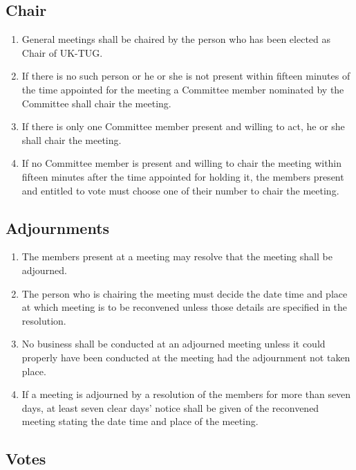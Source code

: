 \documentclass[a4paper,11pt]{article}
\begin{document}
\subsection{Chair}

\begin{enumerate}
\item General meetings shall be chaired by the person who has been elected as
  Chair of UK-TUG.
\item If there is no such person or he or she is not present within fifteen
  minutes of the time appointed for the meeting a Committee member nominated by
  the Committee shall chair the meeting.
\item If there is only one Committee member present and willing to act, he or
  she shall chair the meeting.
\item If no Committee member is present and willing to chair the meeting within
  fifteen minutes after the time appointed for holding it, the members present
  and entitled to vote must choose one of their number to chair the meeting.
\end{enumerate}

\subsection{Adjournments}

\begin{enumerate}
\item The members present at a meeting may resolve that the meeting shall be
  adjourned.
\item The person who is chairing the meeting must decide the date time and place
  at which meeting is to be reconvened unless those details are specified in the
  resolution.
\item No business shall be conducted at an adjourned meeting unless it could
  properly have been conducted at the meeting had the adjournment not taken
  place.
\item If a meeting is adjourned by a resolution of the members for more than
  seven days, at least seven clear days' notice shall be given of the reconvened
  meeting stating the date time and place of the meeting.
\end{enumerate}

\subsection{Votes}
\end{document}
